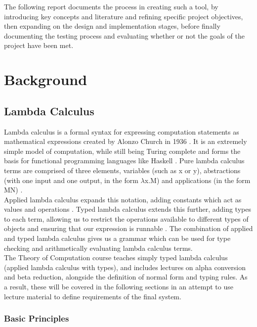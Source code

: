\documentclass[a4paper,11pt]{report}
\begin{document}
The following report documents the process in creating such a tool, by introducing key concepts and literature and refining specific project objectives, then expanding on the design and implementation stages, before finally documenting the testing process and evaluating whether or not the goals of the project have been met.\\

\chapter{Background}
\section{Lambda Calculus}

Lambda calculus is a formal syntax for expressing computation statements as mathematical expressions \cite{Selinger2013} created by Alonzo Church in 1936 \cite{Barendregt2000}. It is an extremely simple model of computation, while still being Turing complete \cite{Rojas1998} and forms the basis for functional programming languages like Haskell \cite{Barendregt2000}. Pure lambda calculus terms are comprised of three elements, variables (such as x or y), abstractions (with one input and one output, in the form $\lambda$x.M) and applications (in the form MN) \cite{Hankin2004}.\\

Applied lambda calculus expands this notation, adding constants which act as values and operations \cite{Slonneger1995}. Typed lambda calculus extends this further, adding types to each term, allowing us to restrict the operations available to different types of objects and ensuring that our expression is runnable \cite{Loader1998}. The combination of applied and typed lambda calculus gives us a grammar which can be used for type checking and arithmetically evaluating lambda calculus terms.\\

The Theory of Computation course teaches simply typed lambda calculus (applied lambda calculus with types), and includes lectures on alpha conversion and beta reduction, alongside the definition of normal form and typing rules. As a result, these will be covered in the following sections in an attempt to use lecture material to define requirements of the final system.

\subsection{Basic Principles}
\end{document}
